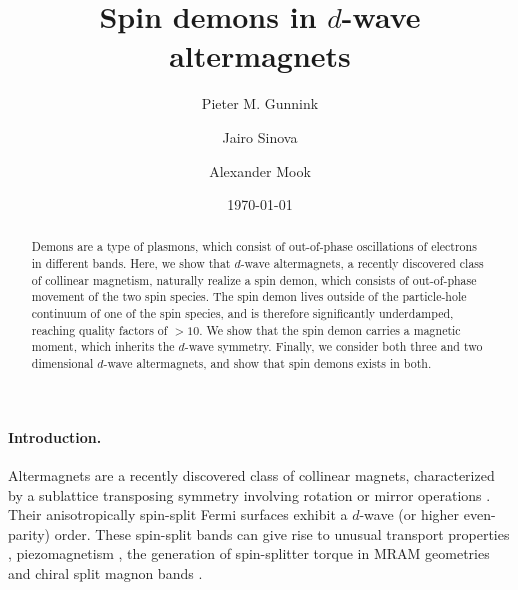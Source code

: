 \documentclass[aps,prl,reprint,twocolumns,superscriptaddress]{revtex4-2}
\begin{document}
	\title{Spin demons in $d$-wave altermagnets}
	\date{\today}
	
	\author{Pieter M. Gunnink}
	\author{Jairo Sinova}
	\author{Alexander Mook}
	\address{Johannes Gutenberg University Mainz, Staudingerweg 7, Mainz 55128, Germany}
	\begin{abstract}
		Demons are a type of plasmons, which consist of out-of-phase oscillations of electrons in different bands. Here, we show that $d$-wave altermagnets, a recently discovered class of collinear magnetism, naturally realize a spin demon, which consists of out-of-phase movement of the two spin species.
		The spin demon lives outside of the particle-hole continuum of one of the spin species, and is therefore significantly underdamped, reaching quality factors of $>10$. We show that the spin demon carries a magnetic moment, which inherits the $d$-wave symmetry. Finally, we consider both three and two dimensional $d$-wave altermagnets, and show that spin demons exists in both.
	\end{abstract}
	
	\maketitle
	
	
	\paragraph{Introduction.}
	Altermagnets are a recently discovered class of collinear magnets, characterized by a sublattice transposing symmetry involving rotation or mirror operations \cite{smejkalConventionalFerromagnetismAntiferromagnetism2022,smejkalEmergingResearchLandscape2022}. Their anisotropically spin-split Fermi surfaces exhibit a $d$-wave (or higher even-parity) order. These spin-split bands can give rise to unusual transport properties \cite{smejkalEmergingResearchLandscape2022,zarzuelaTransportTheorySpintransfer2024,liaoSeparationInverseAltermagnetic2024}, piezomagnetism \cite{aoyamaPiezomagneticPropertiesAltermagnetic2024,yershovFluctuationinducedPiezomagnetismLocal2024}, the generation of spin-splitter torque in
	MRAM geometries \cite{karubeObservationSpinSplitterTorque2022} and chiral split magnon bands \cite{nakaSpinCurrentGeneration2019,liuChiralSplitMagnon2024, smejkalChiralMagnonsAltermagnetic2023}.
	
\end{document}
